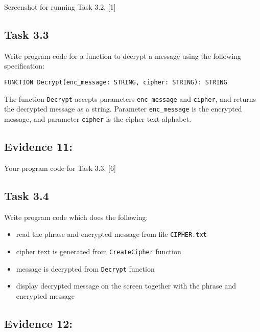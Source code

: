 Screenshot for running Task 3.2.\hfill{} {[}1{]}

\subsection*{Task 3.3}

Write program code for a function to decrypt a message using the following
specification: 
\noindent \begin{center}
\texttt{FUNCTION Decrypt(enc\_message: STRING, cipher: STRING): STRING }
\par\end{center}

The function \texttt{Decrypt} accepts parameters \texttt{enc\_message}
and \texttt{cipher}, and returns the decrypted message as a string.
Parameter \texttt{enc\_message} is the encrypted message, and parameter
\texttt{cipher} is the cipher text alphabet.

\subsection*{Evidence 11: }

Your program code for Task 3.3.\hfill{} {[}6{]}

\subsection*{Task 3.4 }

Write program code which does the following: 
\begin{itemize}
\item read the phrase and encrypted message from file \texttt{CIPHER.txt}
\item cipher text is generated from \texttt{CreateCipher} function 
\item message is decrypted from \texttt{Decrypt} function
\item display decrypted message on the screen together with the phrase and
encrypted message 

\noindent{} 
\end{itemize}

\subsection*{Evidence 12: }

